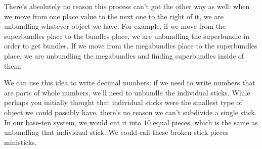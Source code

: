 \documentclass{ximera}
\begin{document}
\begin{image}
\end{image}

There's absolutely no reason this process can't got the other way as well: when we move from one place value to the next one to the right of it, we are unbundling whatever object we have. For example, if we move from the superbundles place to the bundles place, we are unbundling the superbundle in order to get bundles. If we move from the megabundles place to the superbundles place, we are unbundling the megabundles and finding superbundles inside of them. 

\begin{image}
\end{image}

We can use this idea to write decimal numbers: if we need to write numbers that are parts of whole numbers, we'll need to unbundle the individual sticks. While perhaps you initially thought that individual sticks were the smallest type of object we could possibly have, there's no reason we can't subdivide a single stick. In our base-ten system, we would cut it into $10$ equal pieces, which is the same as unbundling that individual stick. We could call these broken stick pieces ministicks.

\begin{image}
\end{image}
\end{document}
